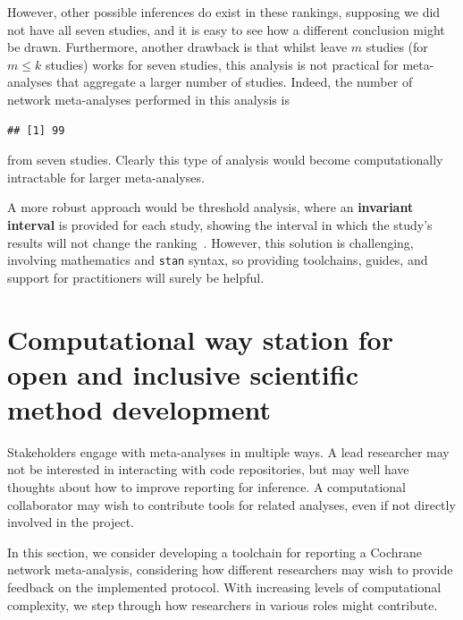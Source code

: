 \documentclass[12pt]{article}\usepackage[]{graphicx}\usepackage[]{color}
\makeatletter
\newenvironment{kframe}{%
 \def\at@end@of@kframe{}%
 \ifinner\ifhmode%
  \def\at@end@of@kframe{\end{minipage}}%
  \begin{minipage}{\columnwidth}%
 \fi\fi%
 \def\FrameCommand##1{\hskip\@totalleftmargin \hskip-\fboxsep
 \colorbox{shadecolor}{##1}\hskip-\fboxsep
     \hskip-\linewidth \hskip-\@totalleftmargin \hskip\columnwidth}%
 \MakeFramed {\advance\hsize-\width
   \@totalleftmargin\z@ \linewidth\hsize
   \@setminipage}}%
 {\par\unskip\endMakeFramed%
 \at@end@of@kframe}
\newenvironment{knitrout}{}{} %
\newcommand{\code}[1]{\texttt{{#1}}}
\makeatother
\begin{document}
However, other possible inferences do exist in these rankings, supposing we did not have all seven studies, and it is easy to see how a different conclusion might be drawn. Furthermore, another drawback is that whilst leave $m$ studies (for $m \leqslant k$ studies) works for seven studies, this analysis is not practical for meta-analyses that aggregate a larger number of studies. Indeed, the number of network meta-analyses performed in this analysis is

\begin{knitrout}
\color{fgcolor}\begin{kframe}
\begin{verbatim}
## [1] 99
\end{verbatim}
\end{kframe}
\end{knitrout}

from seven studies. Clearly this type of analysis would become computationally intractable for larger meta-analyses.

A more robust approach would be threshold analysis, where an \textbf{invariant interval} is provided for each study, showing the interval in which the study's results will not change the ranking~\cite{phillippo_sensitivity_2018}. However, this solution is challenging, involving mathematics and \code{stan} syntax, so providing toolchains, guides, and support for practitioners will surely be helpful.

\section{Computational way station for open and inclusive scientific method development}\label{sec:comp}



Stakeholders engage with meta-analyses in multiple ways. A lead researcher may not be interested in interacting with code repositories, but may well have thoughts about how to improve reporting for inference. A computational collaborator may wish to contribute tools for related analyses, even if not directly involved in the project.

In this section, we consider developing a toolchain for reporting a Cochrane network meta-analysis, considering how different researchers may wish to provide feedback on the implemented protocol. With increasing levels of computational complexity, we step through how researchers in various roles might contribute.
\end{document}
